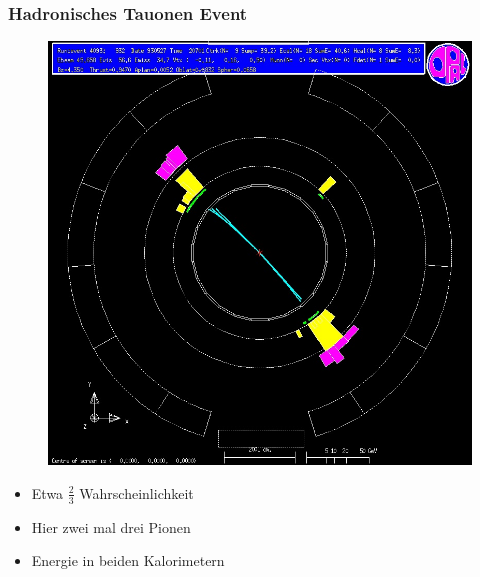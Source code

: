 \begin{frame}
	\frametitle{Hadronisches Tauonen Event}
		\begin{minipage}{0.54\linewidth}
			\begin{figure}
				\centering
				\includegraphics[width=1.0\linewidth]{graphics/tauonopalhadronisch}
			\end{figure}
		\end{minipage}
		\begin{minipage}{0.44\linewidth}
			\begin{center}
				\begin{itemize}
					\item Etwa $\frac{2}{3}$ Wahrscheinlichkeit\\\hfill
					\item Hier zwei mal drei Pionen\\\hfill
					\item Energie in beiden Kalorimetern\\\hfill
				\end{itemize}
			\end{center}
		\end{minipage}
\end{frame}


